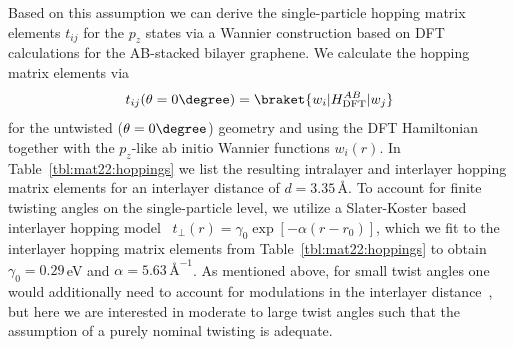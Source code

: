 Based on this assumption we can derive the single-particle hopping matrix elements $t_{ij}$ for the $p_z$ states via a Wannier construction based on DFT calculations for the AB-stacked bilayer graphene.%
We calculate the hopping matrix elements via 
\begin{equation*}
    t_{ij}(\theta=0\degree) = \braket{ w_i | H_\text{DFT}^{AB} | w_j }
\end{equation*}
for the untwisted ($\theta=0\degree$) geometry and using the DFT Hamiltonian together with the $p_z$-like ab initio Wannier functions $w_i(r)$. In Table~\ref{tbl:mat22:hoppings} we list the resulting intralayer and interlayer hopping matrix elements for an interlayer distance of $d=3.35\,$\AA. To account for finite twisting angles on the single-particle level, we utilize a Slater-Koster based interlayer hopping model~\cite{guinea_continuum_2019} $t_\perp(r) = \gamma_0 \operatorname{exp}[-\alpha (r-r_0)]$, which we fit to the interlayer hopping matrix elements from Table~\ref{tbl:mat22:hoppings} to obtain $\gamma_0 = 0.29\,$eV and $\alpha = 5.63\,\text{\AA}^{-1}$. As mentioned above, for small twist angles one would additionally need to account for modulations in the interlayer distance~\cite{wijk_relaxation_2015,shi_large-area_2020,gornostyrev_origin_2020}, but here we are interested in moderate to large twist angles such that the assumption of a purely nominal twisting is adequate.
 
